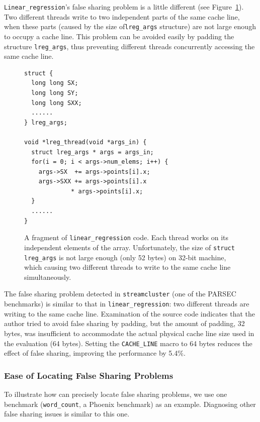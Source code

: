 \texttt{Linear\_regression}'s false sharing problem is a little different (see Figure~\ref{fig:linear_regression}). 
Two different threads write to two independent parts of the same cache line, when these parts (caused by the size of\texttt{lreg\_args} structure) are not large enough to occupy a cache line. This problem can be avoided easily by padding the structure \texttt{lreg\_args}, thus preventing different threads concurrently accessing the same cache line. 

\begin{figure}[!t]
\begin{lstlisting}[style=tt]
struct {
  long long SX;
  long long SY;
  long long SXX;
  ......
} lreg_args;

void *lreg_thread(void *args_in) {
  struct lreg_args * args = args_in;
  for(i = 0; i < args->num_elems; i++) {
    args->SX  += args->points[i].x;
    args->SXX += args->points[i].x 
   	         * args->points[i].x;
  }
  ......	
}
\end{lstlisting}
\caption{A fragment of \texttt{linear\_regression} code. Each thread works on its independent elements of the array. 
Unfortunately, the size of \texttt{struct lreg\_args} is not large enough (only 52 bytes) on 32-bit machine, which causing two different threads to write to the same cache line simultaneously. 
\label{fig:linear_regression}}
\end{figure}

The false sharing problem detected in \texttt{streamcluster} (one of the PARSEC benchmarks) is similar to that in \texttt{linear\_regression}: two different threads are writing to the same cache line. Examination of the source code indicates that the author tried to avoid false sharing by padding, but the amount of padding, 32 bytes, was insufficient to accommodate the actual physical cache line size used in the evaluation (64 bytes). Setting the \texttt{CACHE\_LINE} macro to 64 bytes reduces the effect of false sharing, improving the performance by 5.4\%.


\subsubsection{Ease of Locating False Sharing Problems}

\label{sec:fsfixexample}

To illustrate how \sheriffdetect{} can precisely locate false sharing problems, we use one benchmark (\texttt{word\_count}, a Phoenix benchmark) as an example. Diagnosing other false sharing issues is similar to this one.

